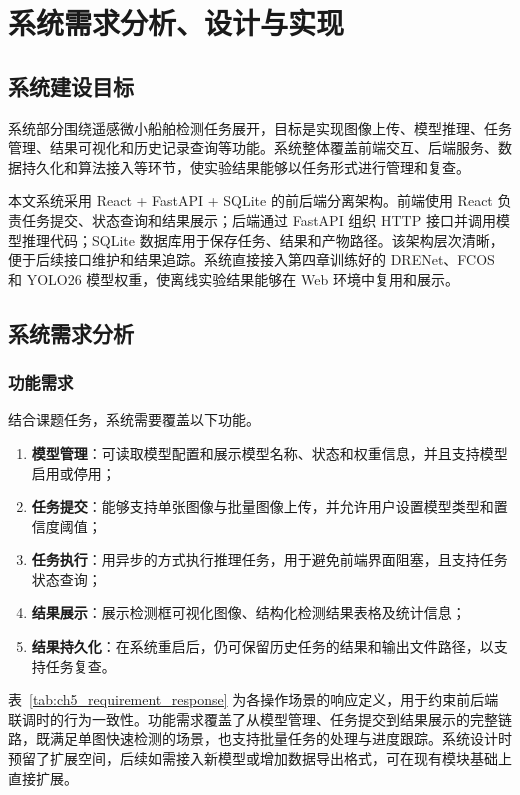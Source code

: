 \section{系统需求分析、设计与实现}\label{sec:system}

\subsection{系统建设目标}

系统部分围绕遥感微小船舶检测任务展开，目标是实现图像上传、模型推理、任务管理、结果可视化和历史记录查询等功能。系统整体覆盖前端交互、后端服务、数据持久化和算法接入等环节，使实验结果能够以任务形式进行管理和复查。

本文系统采用 React + FastAPI + SQLite 的前后端分离架构。前端使用 React 负责任务提交、状态查询和结果展示；后端通过 FastAPI 组织 HTTP 接口并调用模型推理代码；SQLite 数据库用于保存任务、结果和产物路径。该架构层次清晰，便于后续接口维护和结果追踪。系统直接接入第四章训练好的 DRENet、FCOS 和 YOLO26 模型权重，使离线实验结果能够在 Web 环境中复用和展示。

\subsection{系统需求分析}

\subsubsection{功能需求}

结合课题任务，系统需要覆盖以下功能。

\begin{enumerate}[label=（\arabic*）, leftmargin=3.5em]
  \item \textbf{模型管理}：可读取模型配置和展示模型名称、状态和权重信息，并且支持模型启用或停用；
  \item \textbf{任务提交}：能够支持单张图像与批量图像上传，并允许用户设置模型类型和置信度阈值；
  \item \textbf{任务执行}：用异步的方式执行推理任务，用于避免前端界面阻塞，且支持任务状态查询；
  \item \textbf{结果展示}：展示检测框可视化图像、结构化检测结果表格及统计信息；
  \item \textbf{结果持久化}：在系统重启后，仍可保留历史任务的结果和输出文件路径，以支持任务复查。
\end{enumerate}

表~\ref{tab:ch5_requirement_response} 为各操作场景的响应定义，用于约束前后端联调时的行为一致性。功能需求覆盖了从模型管理、任务提交到结果展示的完整链路，既满足单图快速检测的场景，也支持批量任务的处理与进度跟踪。系统设计时预留了扩展空间，后续如需接入新模型或增加数据导出格式，可在现有模块基础上直接扩展。

